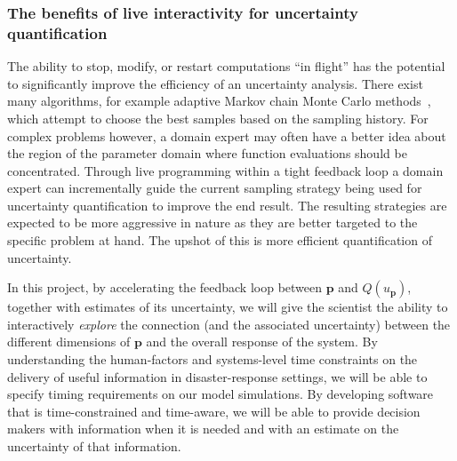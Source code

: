 \documentclass[a4paper,fontsize=12pt]{scrartcl}
\begin{document}
\subsubsection*{The benefits of live interactivity for uncertainty
  quantification}

The ability to stop, modify, or restart computations ``in flight'' has
the potential to significantly improve the efficiency of an
uncertainty analysis. There exist many algorithms, for example
adaptive Markov chain Monte Carlo methods~\parencite{GilksEtal1994}, 
which attempt to choose the best samples based on the sampling
history. For complex problems however, a domain expert may often have
a better idea about the region of the parameter domain where function
evaluations should be concentrated. Through live programming within a
tight feedback loop a domain expert can incrementally guide the
current sampling strategy being used for uncertainty quantification to
improve the end result. The resulting strategies are expected to be
more aggressive in nature as they are better targeted to the specific
problem at hand. The upshot of this is more efficient quantification of
uncertainty.

In this project, by accelerating the feedback loop between
$\mathbf{p}$ and $Q(u_{\mathbf{p}})$, together with estimates of its
uncertainty, we will give the scientist the ability to interactively
\emph{explore} the connection (and the associated uncertainty) between
the different dimensions of $\mathbf{p}$ and the overall response of
the system. By understanding the human-factors and systems-level time
constraints on the delivery of useful information in disaster-response
settings, we will be able to specify timing requirements on our model
simulations. By developing software that is time-constrained and
time-aware, we will be able to provide decision makers with
information when it is needed and with an estimate on the uncertainty
of that information.

\end{document}
